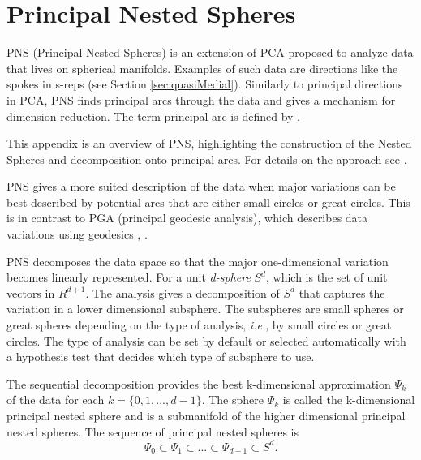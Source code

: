 
\graphicspath{{appendix/images/}}

\chapter{Principal Nested Spheres}
\label{sec:apendixCPNS}

PNS (Principal Nested Spheres) is an extension of PCA proposed to analyze data that lives on spherical manifolds. 
Examples of such data are directions like the spokes in s-reps (see Section \ref{sec:quasiMedial}).
Similarly to principal directions in PCA, PNS finds principal arcs through the data and gives a mechanism 
for dimension reduction. 
The term principal arc is defined by \cite{jung2011principal}.

This appendix is an overview of PNS, highlighting the construction of the Nested Spheres
and decomposition onto principal arcs. For details on the approach see \cite{jung_analysis_2012}.


PNS gives a more suited description of the data when major variations can be best described by potential arcs that are either 
small circles or great circles. 
This is in contrast to PGA (principal geodesic analysis),
which describes data variations using geodesics \cite{fletcher2004principal}, \cite{huckemann2010rejoinder}.

PNS decomposes the data space so that the major one-dimensional variation becomes linearly represented. 
For a unit \textit{d-sphere} $S^d$, which is the set of unit vectors in $R^{d+1}$. The analysis gives a 
decomposition of $S^d$ that captures the variation in a lower dimensional subsphere.
The subspheres are small spheres or great spheres depending on the type of analysis, \textit{i.e.}, by small circles or great circles. 
The type of analysis can be set by default or selected automatically with a hypothesis 
test that decides which type of subsphere to use. 

The sequential decomposition provides the best k-dimensional approximation $\varPsi_k$ of the data for
each $k = \{0, 1, . . . , d - 1\}$. The sphere $\varPsi_k$ is called the k-dimensional principal nested sphere and
is a submanifold of the higher dimensional principal nested spheres. The sequence of principal
nested spheres is
\begin{equation}
 \varPsi_0 \subset \varPsi_1 \subset ... \subset \varPsi_{d-1} \subset S^d.
 \label{equ:sequenceNestedSpheres}
\end{equation}

